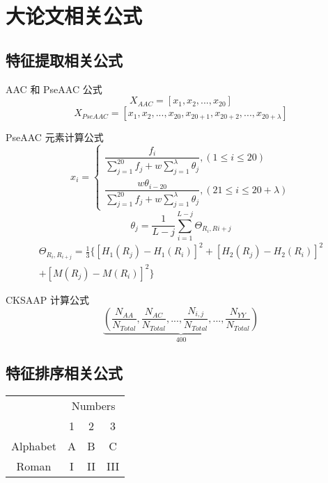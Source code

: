 \section[大论文的相关公式]{大论文相关公式}

\subsection{特征提取相关公式}
AAC 和 PseAAC 公式
\begin{equation}
    X_{AAC}=\left [ x_{1},x_{2},...,x_{20} \right ]
\end{equation}
\begin{equation}
    X_{PseAAC}=\left [ x_{1},x_{2},...,x_{20},x_{20+1},x_{20+2},...,x_{20+\lambda}\right ]
\end{equation}

PseAAC 元素计算公式\cite{chou_prediction_2001}
\begin{equation}
    x_{i}=\begin{cases}
        \dfrac{f_{i}}{\sum_{j=1}^{20}f_{j}+w\sum_{j=1}^{\lambda}\theta_{j}},\left ( 1 \leq i \leq 20 \right ) \\
        \dfrac{w\theta_{i-20}}{\sum_{j=1}^{20}f_{j}+w\sum_{j=1}^{\lambda}\theta_{j}},\left ( 21\leq i \leq 20+\lambda \right )
    \end{cases}
\end{equation}
\begin{equation}
    \theta_{j}=\frac{1}{L-j}\sum_{i=1}^{L-j}\Theta_{R_{i},R{i+j}}
\end{equation}
\begin{multline}
    \Theta_{R_{i},R_{i+j}}=\frac{1}{3} \{ \left[ H_{1}(R_{j}) - H_{1}(R_{i}) \right]^2 + \left[ H_{2}(R_{j}) - H_{2}(R_{i}) \right]^2 \\
    + \left[ M(R_{j}) - M(R_{i}) \right]^2 \}
\end{multline}

CKSAAP 计算公式\cite{tung_computational_2008}
\begin{equation}
    \underbrace{( \frac{N_{AA}}{N_{Total}},\frac{N_{AC}}{N_{Total}},...,\frac{N_{i,j}}{N_{Total}},...,\frac{N_{YY}}{N_{Total}} )}_{400}
\end{equation}

\subsection{特征排序相关公式}
\begin{tabular}{cccc}
    \toprule
    & \multicolumn{3}{c}{Numbers} \\
    \cmidrule{2-4}
    & 1 & 2 & 3 \\
    \midrule
    Alphabet & A & B & C \\
    Roman & I & II& III \\
    \bottomrule
\end{tabular}